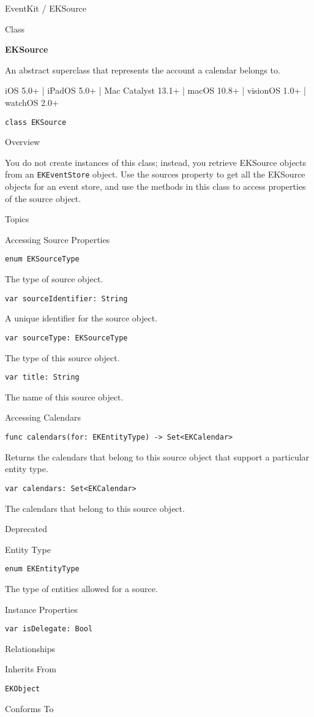 \documentclass{article}
\title{}
\author{}
\date{}
\begin{document}
EventKit / EKSource

Class

\textbf{EKSource}

An abstract superclass that represents the account a calendar belongs to.

iOS 5.0+ | iPadOS 5.0+ | Mac Catalyst 13.1+ | macOS 10.8+ | visionOS 1.0+ | watchOS 2.0+

\texttt{class EKSource}

Overview

You do not create instances of this class; instead, you retrieve EKSource objects from an \texttt{EKEventStore} object. Use the sources property to get all the EKSource objects for an event store, and use the methods in this class to access properties of the source object.

Topics

Accessing Source Properties

\texttt{enum EKSourceType}

The type of source object.

\texttt{var sourceIdentifier: String}

A unique identifier for the source object.

\texttt{var sourceType: EKSourceType}

The type of this source object.

\texttt{var title: String}

The name of this source object.

Accessing Calendars

\texttt{func calendars(for: EKEntityType) -> Set<EKCalendar>}

Returns the calendars that belong to this source object that support a particular entity type.

\texttt{var calendars: Set<EKCalendar>}

The calendars that belong to this source object.

Deprecated

Entity Type

\texttt{enum EKEntityType}

The type of entities allowed for a source.

Instance Properties

\texttt{var isDelegate: Bool}

Relationships

Inherits From

\texttt{EKObject}

Conforms To
\end{document}

